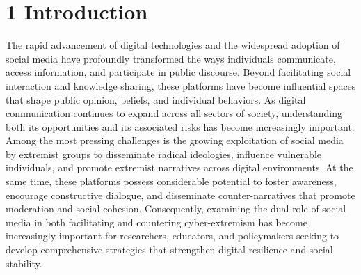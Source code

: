 \documentclass[10pt]{NSP1}
\begin{document}
	
	\maketitle
	
	\section*{1 Introduction}
	
	The rapid advancement of digital technologies and the widespread adoption of social media have profoundly transformed the ways individuals communicate, access information, and participate in public discourse. Beyond facilitating social interaction and knowledge sharing, these platforms have become influential spaces that shape public opinion, beliefs, and individual behaviors. As digital communication continues to expand across all sectors of society, understanding both its opportunities and its associated risks has become increasingly important. Among the most pressing challenges is the growing exploitation of social media by extremist groups to disseminate radical ideologies, influence vulnerable individuals, and promote extremist narratives across digital environments. At the same time, these platforms possess considerable potential to foster awareness, encourage constructive dialogue, and disseminate counter-narratives that promote moderation and social cohesion. Consequently, examining the dual role of social media in both facilitating and countering cyber-extremism has become increasingly important for researchers, educators, and policymakers seeking to develop comprehensive strategies that strengthen digital resilience and social stability.
	
\end{document}
